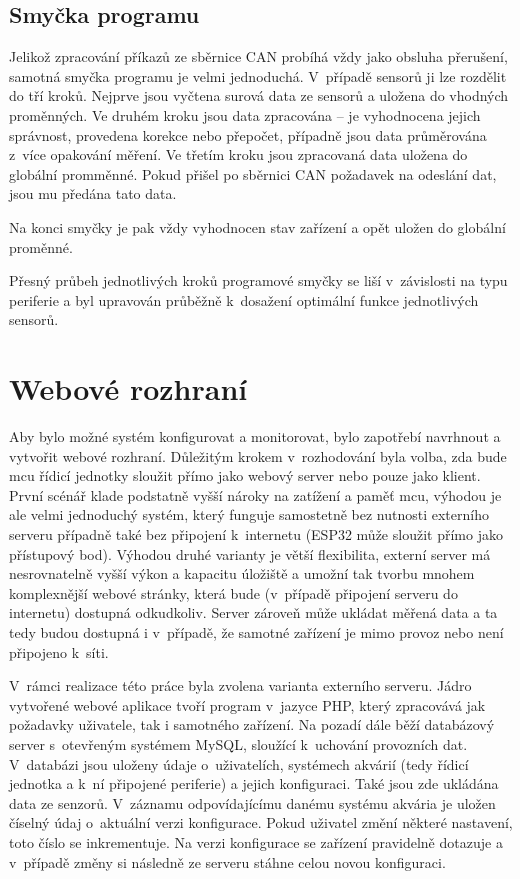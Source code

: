 \subsection{Smyčka programu}
    Jelikož zpracování příkazů ze sběrnice CAN probíhá vždy jako obsluha přerušení, samotná smyčka programu je velmi jednoduchá.  V~případě sensorů ji lze rozdělit do tří kroků. Nejprve jsou vyčtena surová data ze sensorů a uložena do vhodných proměnných. Ve druhém kroku jsou data zpracována -- je vyhodnocena jejich správnost, provedena korekce nebo přepočet, případně jsou data průměrována z~více opakování měření. Ve třetím kroku jsou zpracovaná data uložena do globální promměnné. Pokud přišel po sběrnici CAN požadavek na odeslání dat, jsou mu předána tato data. 

    Na konci smyčky je pak vždy vyhodnocen stav zařízení a opět uložen do globální proměnné.

    Přesný průbeh jednotlivých kroků programové smyčky se liší v~závislosti na typu periferie a byl upravován průběžně k~dosažení optimální funkce jednotlivých sensorů.



\clearpage
\section{Webové rozhraní}
    Aby bylo možné systém konfigurovat a monitorovat, bylo zapotřebí navrhnout a vytvořit webové rozhraní. Důležitým krokem v~rozhodování byla volba, zda bude \acs{mcu} řídicí jednotky sloužit přímo jako webový server nebo pouze jako klient. První scénář klade podstatně vyšší nároky na zatížení a paměť \acs{mcu}, výhodou je ale velmi jednoduchý systém, který funguje samostetně bez nutnosti externího serveru případně také bez připojení k~internetu (ESP32 může sloužit přímo jako přístupový bod). Výhodou druhé varianty je větší flexibilita, externí server má nesrovnatelně vyšší výkon a kapacitu úložiště a umožní tak tvorbu mnohem komplexnější webové stránky, která bude (v~případě připojení serveru do internetu) dostupná odkudkoliv. Server zároveň může ukládat měřená data a ta tedy budou dostupná i v~případě, že samotné zařízení je mimo provoz nebo není připojeno k~síti.

    V~rámci realizace této práce byla zvolena varianta externího serveru. Jádro vytvořené webové aplikace tvoří program v~jazyce PHP, který zpracovává jak požadavky uživatele, tak i samotného zařízení. Na pozadí dále běží databázový server s~otevřeným systémem MySQL, sloužící k~uchování provozních dat. V~databázi jsou uloženy údaje o~uživatelích, systémech akvárií (tedy řídicí jednotka a k~ní připojené periferie) a jejich konfiguraci. Také jsou zde ukládána data ze senzorů. V~záznamu odpovídajícímu danému systému akvária je uložen číselný údaj o~aktuální verzi konfigurace. Pokud uživatel změní některé nastavení, toto číslo se inkrementuje. Na verzi konfigurace se zařízení pravidelně dotazuje a v~případě změny si následně ze serveru stáhne celou novou konfiguraci.

